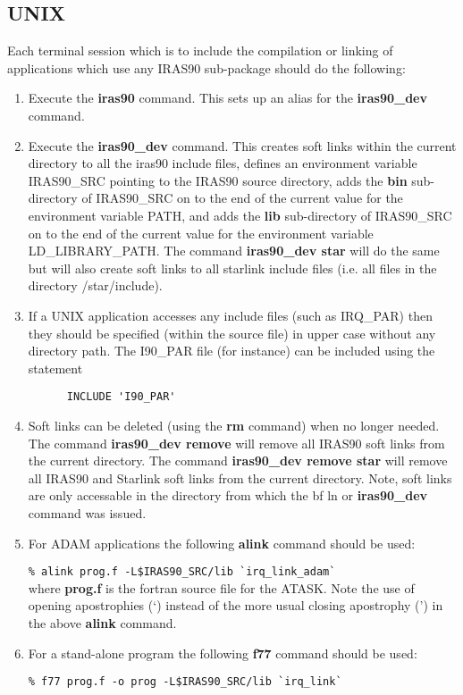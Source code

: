 \subsection{UNIX}

Each terminal session which is to include the compilation or linking of 
applications which use any IRAS90 sub-package should do the following:

\begin{enumerate}
\item Execute the {\bf iras90} command. This sets up an alias for the 
{\bf iras90\_dev} command.

\item Execute the {\bf iras90\_dev} command.  This creates soft links
within the current directory to
all the iras90 include files, defines an environment variable IRAS90\_SRC
pointing to the IRAS90 source directory, adds the {\bf bin}
sub-directory of IRAS90\_SRC on to the end of the current value for the
environment variable PATH, and adds the {\bf lib} sub-directory of 
IRAS90\_SRC on to the end of the current value for the environment 
variable LD\_LIBRARY\_PATH. The command {\bf iras90\_dev star} will do
the same but will also create soft links to all starlink include files
(i.e. all files in the directory /star/include).

\item If a UNIX application accesses any include files (such as
IRQ\_PAR) then they should be specified (within the source file) in upper case 
without any directory
path. The I90\_PAR file (for instance) can be included using the statement

\verb+      INCLUDE 'I90_PAR'+\\

\item Soft links can be deleted (using the {\bf rm} command) when no longer 
needed.
The command {\bf iras90\_dev remove} will remove all IRAS90 soft links from
the current directory. The command {\bf iras90\_dev remove star} will
remove all IRAS90 and Starlink soft links from the current directory.
Note, soft links are only accessable in the directory from which the {bf ln} 
or {\bf iras90\_dev} command was issued. 
\item For ADAM applications the following {\bf alink} command should be used:

\verb+% alink prog.f -L$IRAS90_SRC/lib `irq_link_adam`+\\

where {\bf prog.f} is the fortran source file for the ATASK.
Note the use of opening apostrophies (`) instead of the more usual closing
apostrophy (') in the above {\bf alink} command.

\item For a stand-alone program the following {\bf f77} command should be used:

\verb+% f77 prog.f -o prog -L$IRAS90_SRC/lib `irq_link`+\\
\end{enumerate}



